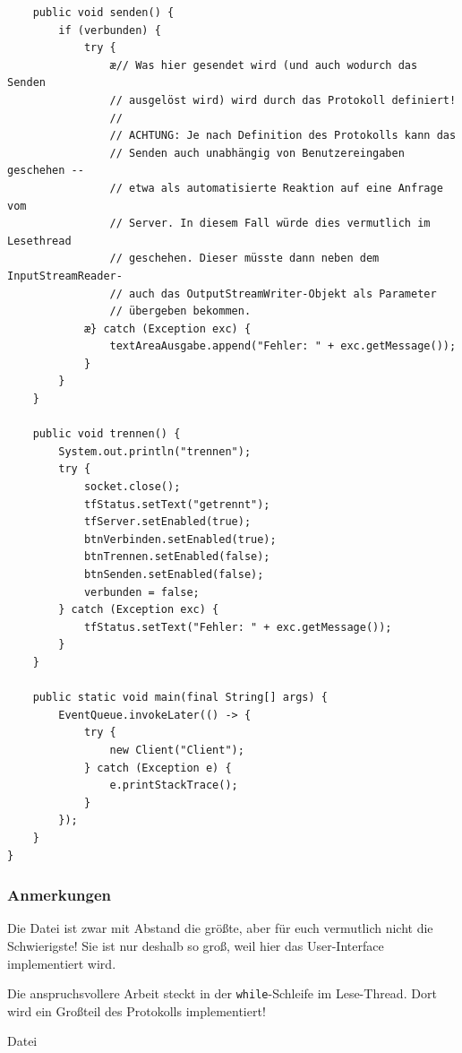 \begin{lstlisting}
	public void senden() {
        if (verbunden) {
            try {
                æ// Was hier gesendet wird (und auch wodurch das Senden
                // ausgelöst wird) wird durch das Protokoll definiert!
                //
                // ACHTUNG: Je nach Definition des Protokolls kann das
                // Senden auch unabhängig von Benutzereingaben geschehen --
                // etwa als automatisierte Reaktion auf eine Anfrage vom
                // Server. In diesem Fall würde dies vermutlich im Lesethread
                // geschehen. Dieser müsste dann neben dem InputStreamReader-
                // auch das OutputStreamWriter-Objekt als Parameter 
                // übergeben bekommen.
            æ} catch (Exception exc) {
                textAreaAusgabe.append("Fehler: " + exc.getMessage());
            }
        }
    }

    public void trennen() {
        System.out.println("trennen");
        try {
            socket.close();
            tfStatus.setText("getrennt");
            tfServer.setEnabled(true);
            btnVerbinden.setEnabled(true);
            btnTrennen.setEnabled(false);
            btnSenden.setEnabled(false);
            verbunden = false;
        } catch (Exception exc) {
            tfStatus.setText("Fehler: " + exc.getMessage());
        }
    }

	public static void main(final String[] args) {
        EventQueue.invokeLater(() -> {
            try {
                new Client("Client");
            } catch (Exception e) {
                e.printStackTrace();
            }
        });
    }
}
\end{lstlisting}

\subsubsection{Anmerkungen}

Die Datei  ist zwar mit Abstand die größte, aber für euch
vermutlich nicht die Schwierigste! Sie ist nur deshalb so groß, weil hier das
User-Interface implementiert wird.

Die anspruchsvollere Arbeit steckt in der \lstinline|while|-Schleife im
Lese-Thread. Dort wird ein Großteil des Protokolls implementiert!

Datei 

